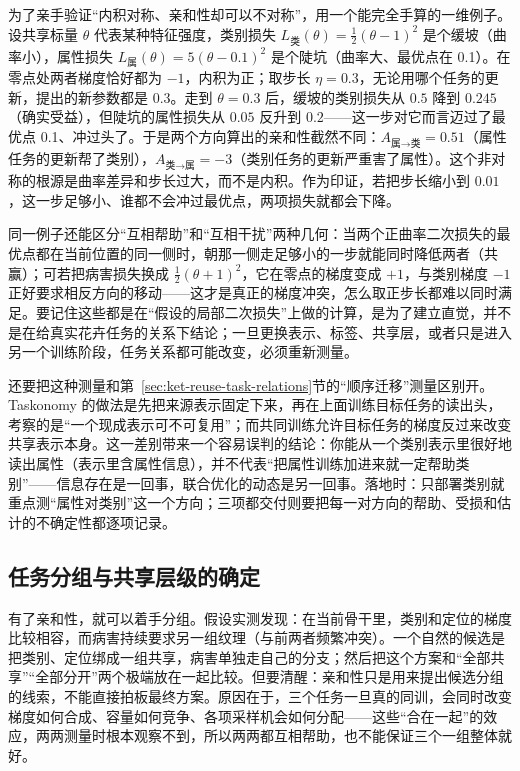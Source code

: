 为了亲手验证“内积对称、亲和性却可以不对称”，用一个能完全手算的一维例子。设共享标量 $\theta$ 代表某种特征强度，类别损失 $L_{\text{类}}(\theta)=\tfrac12(\theta-1)^2$ 是个缓坡（曲率小），属性损失 $L_{\text{属}}(\theta)=5(\theta-0.1)^2$ 是个陡坑（曲率大、最优点在 0.1）。在零点处两者梯度恰好都为 $-1$，内积为正；取步长 $\eta=0.3$，无论用哪个任务的更新，提出的新参数都是 $0.3$。走到 $\theta=0.3$ 后，缓坡的类别损失从 $0.5$ 降到 $0.245$（确实受益），但陡坑的属性损失从 $0.05$ 反升到 $0.2$——这一步对它而言迈过了最优点 0.1、冲过头了。于是两个方向算出的亲和性截然不同：$A_{\text{属}\to\text{类}}=0.51$（属性任务的更新帮了类别），$A_{\text{类}\to\text{属}}=-3$（类别任务的更新严重害了属性）。这个非对称的根源是曲率差异和步长过大，而不是内积。作为印证，若把步长缩小到 $0.01$，这一步足够小、谁都不会冲过最优点，两项损失就都会下降。

同一例子还能区分“互相帮助”和“互相干扰”两种几何：当两个正曲率二次损失的最优点都在当前位置的同一侧时，朝那一侧走足够小的一步就能同时降低两者（共赢）；可若把病害损失换成 $\tfrac12(\theta+1)^2$，它在零点的梯度变成 $+1$，与类别梯度 $-1$ 正好要求相反方向的移动——这才是真正的梯度冲突，怎么取正步长都难以同时满足。要记住这些都是在“假设的局部二次损失”上做的计算，是为了建立直觉，并不是在给真实花卉任务的关系下结论；一旦更换表示、标签、共享层，或者只是进入另一个训练阶段，任务关系都可能改变，必须重新测量。

还要把这种测量和第~\ref{sec:ket-reuse-task-relations}节的“顺序迁移”测量区别开。Taskonomy 的做法是先把来源表示固定下来，再在上面训练目标任务的读出头，考察的是“一个现成表示可不可复用”；而共同训练允许目标任务的梯度反过来改变共享表示本身。这一差别带来一个容易误判的结论：你能从一个类别表示里很好地读出属性（表示里含属性信息），并不代表“把属性训练加进来就一定帮助类别”——信息存在是一回事，联合优化的动态是另一回事。落地时：只部署类别就重点测“属性对类别”这一个方向；三项都交付则要把每一对方向的帮助、受损和估计的不确定性都逐项记录。

\subsection{任务分组与共享层级的确定}
\label{sec:ket-sharing-grouping}

有了亲和性，就可以着手分组。假设实测发现：在当前骨干里，类别和定位的梯度比较相容，而病害持续要求另一组纹理（与前两者频繁冲突）。一个自然的候选是把类别、定位绑成一组共享，病害单独走自己的分支；然后把这个方案和“全部共享”“全部分开”两个极端放在一起比较。但要清醒：亲和性只是用来提出候选分组的线索，不能直接拍板最终方案。原因在于，三个任务一旦真的同训，会同时改变梯度如何合成、容量如何竞争、各项采样机会如何分配——这些“合在一起”的效应，两两测量时根本观察不到，所以两两都互相帮助，也不能保证三个一组整体就好。

